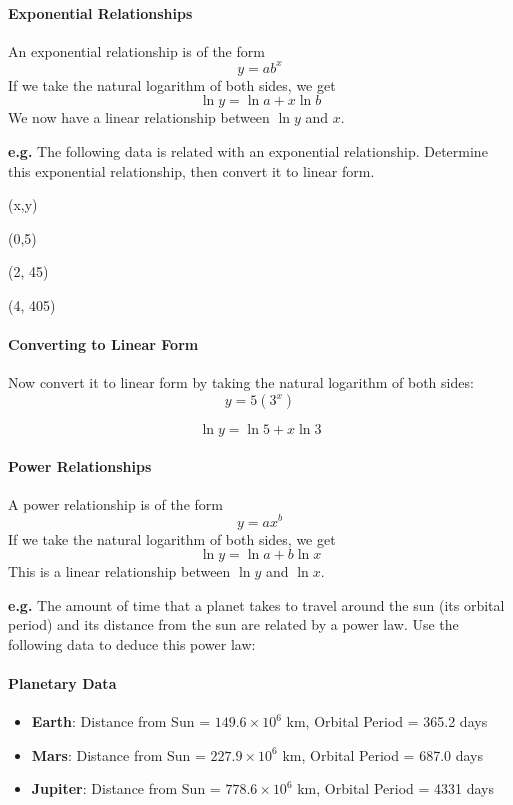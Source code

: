 \paragraph{Exponential Relationships}

An exponential relationship is of the form 
$$
y = ab^x
$$
If we take the natural logarithm of both sides, we get 
$$
\ln y = \ln a + x \ln b
$$
We now have a linear relationship between $\ln y$ and $x$.

\textbf{e.g.} The following data is related with an exponential relationship. Determine this exponential relationship, then convert it to linear form.

(x,y)

(0,5)

(2, 45)

(4, 405)


\paragraph{Converting to Linear Form}

Now convert it to linear form by taking the natural logarithm of both sides:
$$
y = 5 (3^x)
$$

$$
\ln y = \ln 5 + x \ln 3
$$
\paragraph{Power Relationships}

A power relationship is of the form 
$$
y = ax^b
$$
If we take the natural logarithm of both sides, we get 
$$
\ln y = \ln a + b \ln x
$$
This is a linear relationship between $\ln y$ and $\ln x$.

\textbf{e.g.} The amount of time that a planet takes to travel around the sun (its orbital period) and its distance from the sun are related by a power law. Use the following data to deduce this power law:

\paragraph{Planetary Data}

\begin{itemize}
    \item \textbf{Earth}: Distance from Sun = $149.6 \times 10^6$ km, Orbital Period = 365.2 days
    \item \textbf{Mars}: Distance from Sun = $227.9 \times 10^6$ km, Orbital Period = 687.0 days
    \item \textbf{Jupiter}: Distance from Sun = $778.6 \times 10^6$ km, Orbital Period = 4331 days
\end{itemize}

